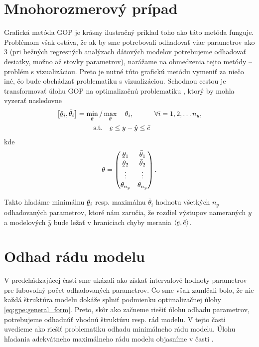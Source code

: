 \section{Mnohorozmerový prípad}
Grafická metóda GOP je krásny ilustračný príklad toho ako táto metóda funguje. Problémom však ostáva, že ak by sme potrebovali odhadovať viac parametrov ako 3 (pri bežných regresných analýzach dátových modelov potrebujeme odhadovať desiatky, možno až stovky parametrov), narážame na obmedzenia tejto metódy -- problém s vizualizáciou. Preto je nutné túto grafickú metódu vymeniť za niečo iné, čo bude obchádzať problematiku s vizualizáciou. Schodnou cestou je transformovať úlohu GOP na optimalizačnú problematiku \cite{artzova:gpe_moving_hor:2019}, ktorý by mohla vyzerať nasledovne 
\begin{equation}
	\begin{split}
		\left[ \ubar{\theta}_i, \bar{\theta}_i \right] = \min_{\theta} / &\max_{\theta} \quad \theta_i, \quad\qquad \forall i = 1,2, \dots n_y, \\
		\text{s.t.}& \quad \ubar{e} \leq y - \hat{y} \leq \bar{e}	
	\end{split}
	\label{eq:gpe:general_form}
\end{equation} 
kde 
\begin{equation*}
	\theta = 
	\begin{pmatrix}
		\ubar{\theta}_1 & \bar{\theta}_1 \\
		\ubar{\theta}_2 & \bar{\theta}_2 \\
		\vdots & \vdots \\
		\ubar{\theta}_{n_y} & \bar{\theta}_{n_y}	
	\end{pmatrix}.
\end{equation*}

Takto hľadáme minimálnu $ \ubar{\theta}_i $ resp. maximálnu $ \bar{\theta}_i $ hodnotu všetkých 
$ n_y $ odhadovaných  parametrov, ktoré nám zaručia, že rozdiel výstupov nameraných $ y $ a modelových $ \hat{y} $ bude ležať v hraniciach chyby merania $ \langle \ubar{e}, \bar{e} \rangle $.

\section{Odhad rádu modelu}
V predchádzajúcej časti sme ukázali ako získať intervalové hodnoty parametrov pre ľubovoľný počet odhadovaných parametrov. Čo sme však zamlčali bolo, že nie každá štruktúra modelu dokáže splniť podmienku optimalizačnej úlohy
\ref{eq:gpe:general_form}. Preto, skôr ako začneme riešiť úlohu odhadu parametrov, potrebujeme odhadnúť vhodnú štruktúru resp. rád modelu. V tejto časti uvedieme ako riešiť problematiku odhadu minimálneho rádu modelu. Úlohu hľadania adekvátneho maximálneho rádu modelu objasníme v časti .

